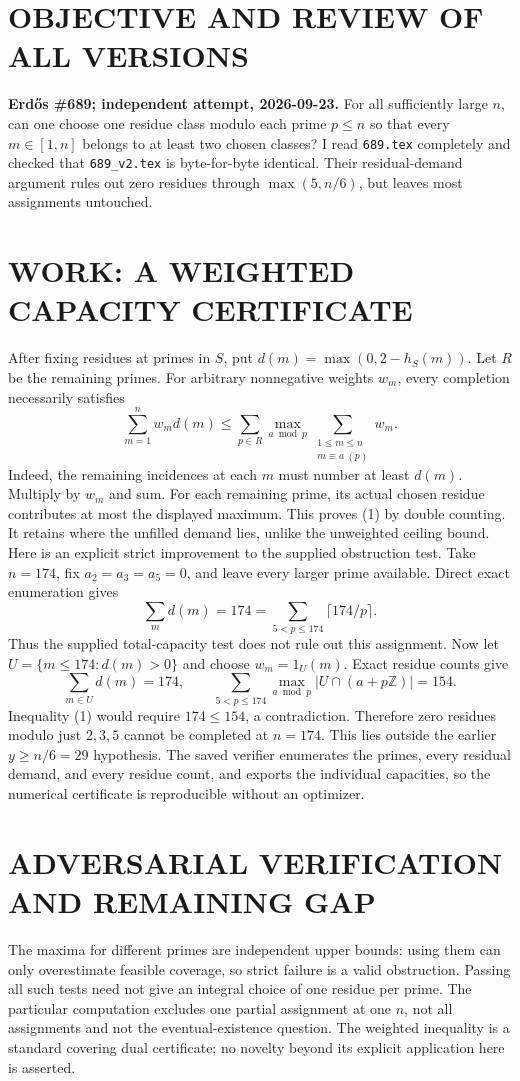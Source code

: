 \section{OBJECTIVE AND REVIEW OF ALL VERSIONS}
\textbf{Erd\H{o}s \#689; independent attempt, 2026-09-23.}
For all sufficiently large $n$, can one choose one residue class modulo each prime $p\le n$ so that every $m\in[1,n]$ belongs to at least two chosen classes? I read \texttt{689.tex} completely and checked that \texttt{689\_v2.tex} is byte-for-byte identical. Their residual-demand argument rules out zero residues through $\max(5,n/6)$, but leaves most assignments untouched.
\section{WORK: A WEIGHTED CAPACITY CERTIFICATE}
After fixing residues at primes in $S$, put $d(m)=\max(0,2-h_S(m))$. Let $R$ be the remaining primes. For arbitrary nonnegative weights $w_m$, every completion necessarily satisfies
\[
\sum_{m=1}^n w_m d(m)\le
\sum_{p\in R}\max_{a\bmod p}\sum_{\substack{1\le m\le n\\m\equiv a\ (p)}}w_m.
\tag{1}
\]
Indeed, the remaining incidences at each $m$ must number at least $d(m)$. Multiply by $w_m$ and sum. For each remaining prime, its actual chosen residue contributes at most the displayed maximum. This proves (1) by double counting. It retains where the unfilled demand lies, unlike the unweighted ceiling bound.
Here is an explicit strict improvement to the supplied obstruction test. Take $n=174$, fix $a_2=a_3=a_5=0$, and leave every larger prime available. Direct exact enumeration gives
\[
\sum_m d(m)=174=\sum_{5<p\le174}\lceil174/p\rceil.
\]
Thus the supplied total-capacity test does not rule out this assignment. Now let $U=\{m\le174:d(m)>0\}$ and choose $w_m=1_U(m)$. Exact residue counts give
\[
\sum_{m\in U}d(m)=174,
\qquad
\sum_{5<p\le174}\max_{a\bmod p}|U\cap(a+p\mathbb Z)|=154.
\]
Inequality (1) would require $174\le154$, a contradiction. Therefore zero residues modulo just $2,3,5$ cannot be completed at $n=174$. This lies outside the earlier $y\ge n/6=29$ hypothesis. The saved verifier enumerates the primes, every residual demand, and every residue count, and exports the individual capacities, so the numerical certificate is reproducible without an optimizer.
\section{ADVERSARIAL VERIFICATION AND REMAINING GAP}
The maxima for different primes are independent upper bounds: using them can only overestimate feasible coverage, so strict failure is a valid obstruction. Passing all such tests need not give an integral choice of one residue per prime. The particular computation excludes one partial assignment at one $n$, not all assignments and not the eventual-existence question. The weighted inequality is a standard covering dual certificate; no novelty beyond its explicit application here is asserted.
